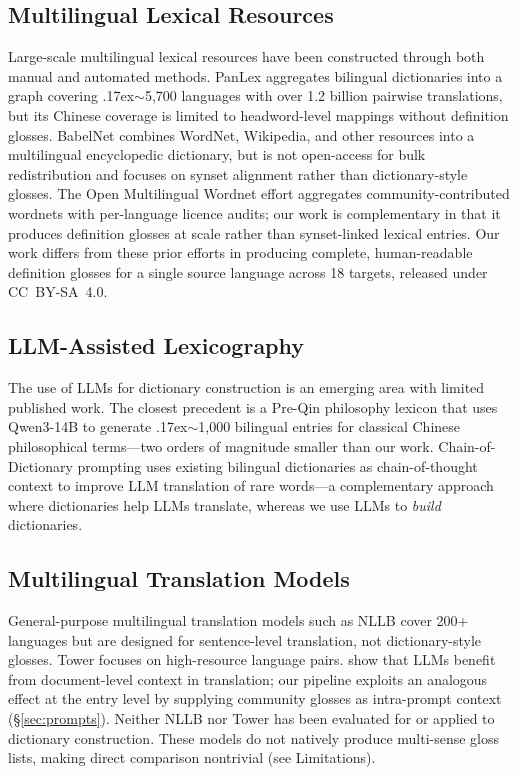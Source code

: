 \documentclass[11pt]{article}
\begin{document}
\subsection{Multilingual Lexical Resources}

Large-scale multilingual lexical resources have been constructed through both manual and automated methods. PanLex \citep{kamholz2014panlex} aggregates bilingual dictionaries into a graph covering {\raise.17ex\hbox{$\scriptstyle\sim$}}5,700 languages with over 1.2 billion pairwise translations, but its Chinese coverage is limited to headword-level mappings without definition glosses. BabelNet \citep{navigli2012babelnet} combines WordNet, Wikipedia, and other resources into a multilingual encyclopedic dictionary, but is not open-access for bulk redistribution and focuses on synset alignment rather than dictionary-style glosses. The Open Multilingual Wordnet effort \citep{bond2012wordnets} aggregates community-contributed wordnets with per-language licence audits; our work is complementary in that it produces definition glosses at scale rather than synset-linked lexical entries. Our work differs from these prior efforts in producing complete, human-readable definition glosses for a single source language across 18 targets, released under CC~BY-SA~4.0.

\subsection{LLM-Assisted Lexicography}

The use of LLMs for dictionary construction is an emerging area with limited published work. The closest precedent is a Pre-Qin philosophy lexicon \citep{wu2025preqin} that uses Qwen3-14B to generate {\raise.17ex\hbox{$\scriptstyle\sim$}}1,000 bilingual entries for classical Chinese philosophical terms---two orders of magnitude smaller than our work. Chain-of-Dictionary prompting \citep{lu2024chainofdict} uses existing bilingual dictionaries as chain-of-thought context to improve LLM translation of rare words---a complementary approach where dictionaries help LLMs translate, whereas we use LLMs to \textit{build} dictionaries.

\subsection{Multilingual Translation Models}

General-purpose multilingual translation models such as NLLB \citep{costajussa2022nllb} cover 200+ languages but are designed for sentence-level translation, not dictionary-style glosses. Tower \citep{alves2024tower} focuses on high-resource language pairs. \citet{wang2023doclevel} show that LLMs benefit from document-level context in translation; our pipeline exploits an analogous effect at the entry level by supplying community glosses as intra-prompt context (\S\ref{sec:prompts}). Neither NLLB nor Tower has been evaluated for or applied to dictionary construction. These models do not natively produce multi-sense gloss lists, making direct comparison nontrivial (see Limitations).
\end{document}

